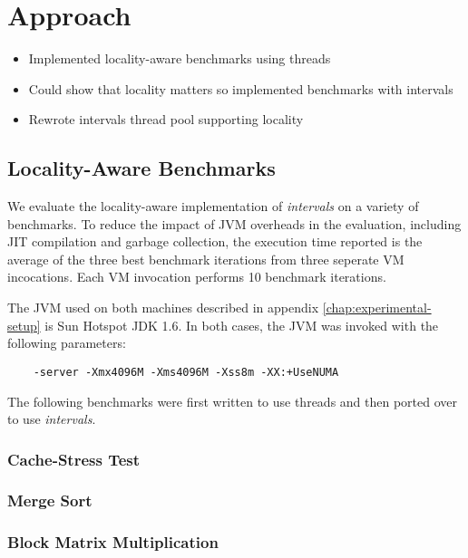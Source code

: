 
\chapter{Approach}
\label{chap:locality-approach}


\begin{itemize}
\item Implemented locality-aware benchmarks using threads
\item Could show that locality matters so implemented benchmarks with
  intervals
\item Rewrote intervals thread pool supporting locality
\end{itemize}

\section{Locality-Aware Benchmarks}

We evaluate the locality-aware implementation of \emph{intervals} on a
variety of benchmarks. To reduce the impact of JVM overheads in the
evaluation, including JIT compilation and garbage collection, the
execution time reported is the average of the three best benchmark
iterations from three seperate VM incocations. Each VM invocation
performs 10 benchmark iterations.

The JVM used on both machines described in appendix
\ref{chap:experimental-setup} is Sun Hotspot JDK 1.6. In both cases,
the JVM was invoked with the following parameters:

\begin{verbatim}
    -server -Xmx4096M -Xms4096M -Xss8m -XX:+UseNUMA
\end{verbatim}

The following benchmarks were first written to use threads and then
ported over to use \emph{intervals}.

\subsection*{Cache-Stress Test}


\subsection*{Merge Sort}


\subsection*{Block Matrix Multiplication}



